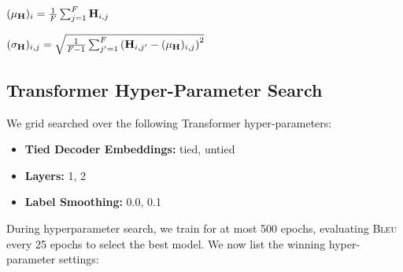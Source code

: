 $(\mu_{\mathbf{H}})_i = \frac{1}{F} \sum_{j=1}^F \mathbf{H}_{i,j} $


$(\sigma_{\mathbf{H}})_{i,j} = \sqrt{\frac{1}{F-1} \sum_{j^\prime=1}^F \left( \mathbf{H}_{i,j^\prime} - (\mu_{\mathbf{H}})_{i,j}\right)^2} $

%
%
%
%


\subsection{Transformer Hyper-Parameter Search}
We grid searched over the following Transformer hyper-parameters:
\begin{itemize}
    \item \textbf{Tied Decoder Embeddings:} tied, untied
    \item \textbf{Layers:} 1, 2
    \item \textbf{Label Smoothing:} 0.0, 0.1
\end{itemize}

During hyperparameter search, we train for at most 500
epochs, evaluating \textsc{Bleu} every 25 epochs to select the best model.
We now list the winning hyper-parameter settings:


